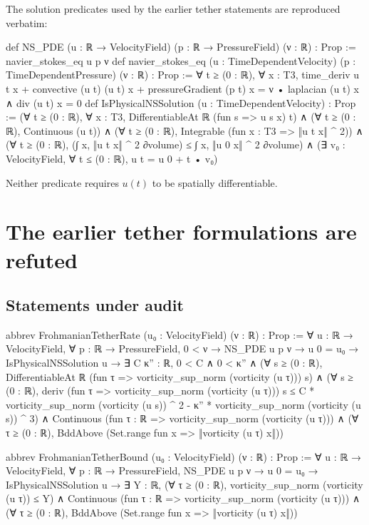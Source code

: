 \documentclass[11pt,a4paper]{article}
\theoremstyle{definition}
\theoremstyle{remark}
\begin{document}
The solution predicates used by the earlier tether statements are reproduced verbatim:

\begin{leancode}
def NS_PDE (u : ℝ → VelocityField) (p : ℝ → PressureField) (ν : ℝ) : Prop :=
  navier_stokes_eq u p ν
def navier_stokes_eq (u : TimeDependentVelocity) (p : TimeDependentPressure)
    (ν : ℝ) : Prop :=
  ∀ t ≥ (0 : ℝ), ∀ x : T3,
    time_deriv u t x + convective (u t) (u t) x + pressureGradient (p t) x =
        ν • laplacian (u t) x ∧
      div (u t) x = 0
def IsPhysicalNSSolution (u : TimeDependentVelocity) : Prop :=
  (∀ t ≥ (0 : ℝ), ∀ x : T3, DifferentiableAt ℝ (fun s => u s x) t) ∧
  (∀ t ≥ (0 : ℝ), Continuous (u t)) ∧
  (∀ t ≥ (0 : ℝ), Integrable (fun x : T3 => ‖u t x‖ ^ 2)) ∧
  (∀ t ≥ (0 : ℝ), (∫ x, ‖u t x‖ ^ 2 ∂volume) ≤ ∫ x, ‖u 0 x‖ ^ 2 ∂volume) ∧
  (∃ v₀ : VelocityField, ∀ t ≤ (0 : ℝ), u t = u 0 + t • v₀)
\end{leancode}

\noindent Neither predicate requires $u(t)$ to be spatially differentiable.

\section{The earlier tether formulations are refuted}\label{sec:refute}

\subsection{Statements under audit}
\begin{leancode}
abbrev FrohmanianTetherRate (u₀ : VelocityField) (ν : ℝ) : Prop :=
  ∀ u : ℝ → VelocityField, ∀ p : ℝ → PressureField,
    0 < ν → NS_PDE u p ν → u 0 = u₀ → IsPhysicalNSSolution u →
      ∃ C κ'' : ℝ, 0 < C ∧ 0 < κ'' ∧
        (∀ s ≥ (0 : ℝ),
          DifferentiableAt ℝ (fun τ => vorticity_sup_norm (vorticity (u τ))) s) ∧
        (∀ s ≥ (0 : ℝ),
          deriv (fun τ => vorticity_sup_norm (vorticity (u τ))) s ≤
            C * vorticity_sup_norm (vorticity (u s)) ^ 2 -
              κ'' * vorticity_sup_norm (vorticity (u s)) ^ 3) ∧
        Continuous (fun τ : ℝ => vorticity_sup_norm (vorticity (u τ))) ∧
        (∀ τ ≥ (0 : ℝ), BddAbove (Set.range fun x => ‖vorticity (u τ) x‖))

abbrev FrohmanianTetherBound (u₀ : VelocityField) (ν : ℝ) : Prop :=
  ∀ u : ℝ → VelocityField, ∀ p : ℝ → PressureField,
    NS_PDE u p ν → u 0 = u₀ → IsPhysicalNSSolution u →
      ∃ Y : ℝ,
        (∀ τ ≥ (0 : ℝ), vorticity_sup_norm (vorticity (u τ)) ≤ Y) ∧
        Continuous (fun τ : ℝ => vorticity_sup_norm (vorticity (u τ))) ∧
        (∀ τ ≥ (0 : ℝ), BddAbove (Set.range fun x => ‖vorticity (u τ) x‖))
\end{leancode}
\end{document}
